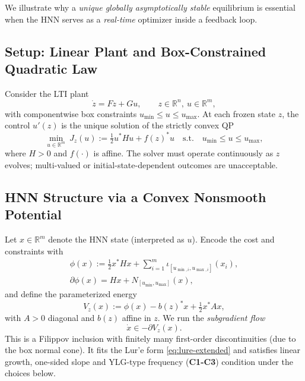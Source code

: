 \documentclass[journal]{IEEEtran}
\theoremstyle{myplain}
\begin{document}
We illustrate why a \emph{unique globally asymptotically stable} equilibrium is essential when the HNN serves as a \emph{real-time} optimizer inside a feedback loop.

\subsection{Setup: Linear Plant and Box-Constrained Quadratic Law}
Consider the LTI plant
\begin{equation}\label{eq:plant}
  \dot z = Fz + Gu, \qquad z\in\mathbb{R}^n,\ u\in\mathbb{R}^m,
\end{equation}
with componentwise box constraints \(u_{\min}\le u\le u_{\max}\).
At each frozen state \(z\), the control \(u'(z)\) is the unique solution of the strictly convex QP
\begin{equation}\label{eq:opt-problem}
  \min_{u\in\mathbb{R}^m}\ J_z(u) := \tfrac12 u^* H u + f(z)^* u
  \quad\text{s.t.}\quad u_{\min}\le u\le u_{\max},
\end{equation}
where \(H>0\) and \(f(\cdot)\) is affine. The solver must operate continuously as \(z\) evolves; multi-valued or initial-state-dependent outcomes are unacceptable.

\subsection{HNN Structure via a Convex Nonsmooth Potential}
Let \(x\in\mathbb{R}^m\) denote the HNN state (interpreted as \(u\)).
Encode the cost and constraints with
\begin{multline}\label{eq:phi-def}
  \phi(x):=\tfrac12 x^* Hx + \sum_{i=1}^m \iota_{[u_{\min,i},u_{\max,i}]}(x_i),
  \\
  \partial\phi(x)=Hx + N_{[u_{\min},u_{\max}]}(x),
\end{multline}
and define the parameterized energy
\begin{equation}\label{eq:Vz-def}
  V_z(x):=\phi(x)-b(z)^* x+\tfrac12 x^* A x,
\end{equation}
with \(A>0\) diagonal and \(b(z)\) affine in \(z\).
We run the \emph{subgradient flow}
\begin{equation}\label{eq:hnn-subgrad}
  \dot x \in -\partial V_z(x).
\end{equation}
This is a Filippov inclusion with finitely many first-order discontinuities (due to the box normal cone). It fits the Lur’e form \eqref{eq:lure-extended} and satisfies linear growth, one-sided slope and YLG-type frequency (\textbf{C1-C3}) condition under the choices below.
\end{document}
